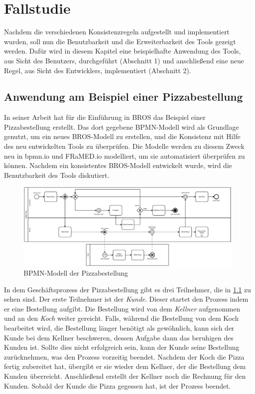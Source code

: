 \chapter{Fallstudie}
\label{chap:evaluation}

Nachdem die verschiedenen Konsistenzregeln aufgestellt und implementiert wurden, soll nun die Benutzbarkeit und die Erweiterbarkeit des Tools gezeigt werden.
Dafür wird in diesem Kapitel eine beispielhafte Anwendung des Tools, aus Sicht des Benutzers, durchgeführt (Abschnitt 1) und anschließend eine neue Regel, aus Sicht des Entwicklers, implementiert (Abschnitt 2).

\section{Anwendung am Beispiel einer Pizzabestellung}

In seiner Arbeit hat \cite{Schoen} für die Einführung in BROS das Beispiel einer Pizzabestellung erstellt.
Das dort gegebene BPMN-Modell wird als Grundlage genutzt, um ein neues BROS-Modell zu erstellen, und die Konsistenz mit Hilfe des neu entwickelten Tools zu überprüfen.
Die Modelle werden zu diesem Zweck neu in bpmn.io und FRaMED.io modelliert, um sie automatisiert überprüfen zu können.
Nachdem ein konsistentes BROS-Modell entwickelt wurde, wird die Benutzbarkeit des Tools diskutiert.

\begin{figure}
    \centering
    \includegraphics[width=\textwidth,keepaspectratio]{../images/example/bpmn.pdf}%
    \caption{BPMN-Modell der Pizzabestellung}%
    \label{fig:pizzaBpmn}
\end{figure}

In dem Geschäftsprozess der Pizzabestellung gibt es drei Teilnehmer, die in \cref{fig:pizzaBpmn} zu sehen sind.
Der erste Teilnehmer ist der \emph{Kunde}.
Dieser startet den Prozess indem er eine Bestellung aufgibt.
Die Bestellung wird von dem \emph{Kellner} aufgenommen und an den \emph{Koch} weiter gereicht.
Falls, während die Bestellung von dem Koch bearbeitet wird, die Bestellung länger benötigt als gewöhnlich, kann sich der Kunde bei dem Kellner beschweren, dessen Aufgabe dann das beruhigen des Kunden ist.
Sollte dies nicht erfolgreich sein, kann der Kunde seine Bestellung zurücknehmen, was den Prozess vorzeitig beendet.
Nachdem der Koch die Pizza fertig zubereitet hat, übergibt er sie wieder dem Kellner, der die Bestellung dem Kunden überreicht.
Anschließend erstellt der Kellner noch die Rechnung für den Kunden.
Sobald der Kunde die Pizza gegessen hat, ist der Prozess beendet.


